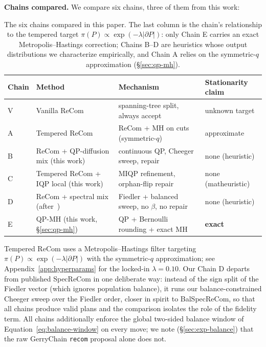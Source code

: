 \documentclass[11pt]{article}
\begin{document}
\textbf{Chains compared.} We compare six chains, three of them from
this work:

\begin{table}[H]
\centering
\small
\begin{tabular}{llll}
\toprule
Chain & Method & Mechanism & Stationarity claim \\
\midrule
V & Vanilla ReCom~\cite{deford2021recombination} & spanning-tree split, always accept & unknown target \\
A & Tempered ReCom & ReCom + MH on cuts (symmetric-$q$) & approximate \\
B & ReCom + QP-diffusion mix (this work) & continuous QP, Cheeger sweep, repair & none (heuristic) \\
C & Tempered ReCom + IQP local (this work) & MIQP refinement, orphan-flip repair & none (matheuristic) \\
D & ReCom + spectral mix (after~\cite{davies2025spectral}) & Fiedler + balanced sweep, no $\beta$, no repair & none (heuristic) \\
E & QP-MH (this work, \S\ref{sec:qp-mh}) & QP + Bernoulli rounding + exact MH & \textbf{exact} \\
\bottomrule
\end{tabular}
\caption{The six chains compared in this paper. The last column is the
  chain's relationship to the tempered target
  $\pi(P) \propto \exp(-\lambda|\partial P|)$: only Chain E carries an
  exact Metropolis--Hastings correction; Chains B--D are heuristics
  whose output distributions we characterize empirically, and Chain A
  relies on the symmetric-$q$ approximation
  (\S\ref{sec:qp-mh}).}
\label{tab:five-chains}
\end{table}

Tempered ReCom uses a Metropolis--Hastings filter targeting
$\pi(P) \propto \exp(-\lambda |\partial P|)$ with the symmetric-$q$
approximation; see Appendix~\ref{app:hyperparams} for the locked-in
$\lambda = 0.10$. Our Chain D departs from published SpecReCom in one
deliberate way: instead of the sign split of the Fiedler vector (which
ignores population balance), it runs our balance-constrained Cheeger
sweep over the Fiedler order, closer in spirit to BalSpecReCom, so that all chains produce valid plans and the comparison isolates the
role of the fidelity term. All chains additionally enforce the global
two-sided balance window of Equation~\eqref{eq:balance-window} on
every move; we note (\S\ref{sec:exp-balance}) that the raw GerryChain
\texttt{recom} proposal alone does not.
\end{document}
